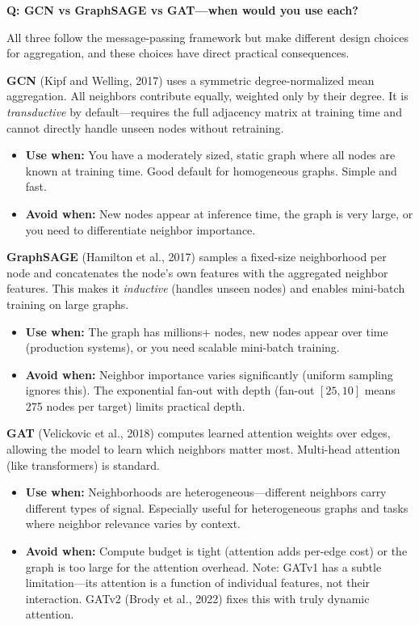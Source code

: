 \begin{interviewq}
\textbf{Q: GCN vs GraphSAGE vs GAT---when would you use each?}

 \quad {} \quad \badgefreq{\freqmed}

\stronganswer

All three follow the message-passing framework but make different design choices for aggregation, and these choices have direct practical consequences.

\textbf{GCN} (Kipf and Welling, 2017) uses a symmetric degree-normalized mean aggregation. All neighbors contribute equally, weighted only by their degree. It is \textit{transductive} by default---requires the full adjacency matrix at training time and cannot directly handle unseen nodes without retraining.
\begin{itemize}
    \item \textbf{Use when:} You have a moderately sized, static graph where all nodes are known at training time. Good default for homogeneous graphs. Simple and fast.
    \item \textbf{Avoid when:} New nodes appear at inference time, the graph is very large, or you need to differentiate neighbor importance.
\end{itemize}

\textbf{GraphSAGE} (Hamilton et al., 2017) samples a fixed-size neighborhood per node and concatenates the node's own features with the aggregated neighbor features. This makes it \textit{inductive} (handles unseen nodes) and enables mini-batch training on large graphs.
\begin{itemize}
    \item \textbf{Use when:} The graph has millions+ nodes, new nodes appear over time (production systems), or you need scalable mini-batch training.
    \item \textbf{Avoid when:} Neighbor importance varies significantly (uniform sampling ignores this). The exponential fan-out with depth (fan-out $[25, 10]$ means 275 nodes per target) limits practical depth.
\end{itemize}

\textbf{GAT} (Velickovic et al., 2018) computes learned attention weights over edges, allowing the model to learn which neighbors matter most. Multi-head attention (like transformers) is standard.
\begin{itemize}
    \item \textbf{Use when:} Neighborhoods are heterogeneous---different neighbors carry different types of signal. Especially useful for heterogeneous graphs and tasks where neighbor relevance varies by context.
    \item \textbf{Avoid when:} Compute budget is tight (attention adds per-edge cost) or the graph is too large for the attention overhead. Note: GATv1 has a subtle limitation---its attention is a function of individual features, not their interaction. GATv2 (Brody et al., 2022) fixes this with truly dynamic attention.
\end{itemize}


\end{interviewq}
